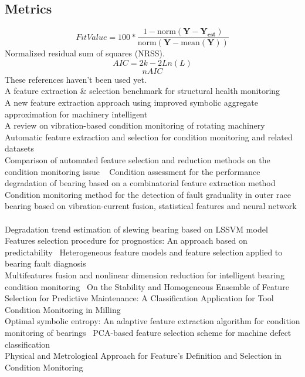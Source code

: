 \documentclass[]{article}
\begin{document}
\subsection{Metrics}
$$ FitValue = 100 * \frac{ 1 - \textrm{norm}(\mathbf{Y} - \mathbf{Y_{est}}) } { \textrm{norm}(\mathbf{Y}-\textrm{mean}(\mathbf{Y})) } $$
Normalized residual sum of squares (NRSS).
$$ AIC = 2k - 2Ln(L) $$  
$$ nAIC $$
These references haven't been used yet.\\
A feature extraction \& selection benchmark for structural health monitoring ~\cite{buckley2023feature}\\
A new feature extraction approach using improved symbolic aggregate approximation for machinery intelligent ~\cite{zhang2019new}\\
A review on vibration-based condition monitoring of rotating machinery ~\cite{tiboni2022review}\\
Automatic feature extraction and selection for condition monitoring and related datasets ~\cite{schneider2018automatic}\\
Comparison of automated feature selection and reduction methods on the condition monitoring issue ~\cite{de2018comparison}
Condition assessment for the performance degradation of bearing based on a combinatorial feature extraction method ~\cite{hong2014condition}\\
Condition monitoring method for the detection of fault graduality in outer race bearing based on vibration-current fusion, statistical features and neural network ~\cite{saucedo2021condition}\\
Degradation trend estimation of slewing bearing based on LSSVM model~\cite{lu2016degradation}\\
Features selection procedure for prognostics: An approach based on predictability~\cite{javed2012features}
Heterogeneous feature models and feature selection applied to bearing fault diagnosis~\cite{rauber2014heterogeneous}\\
Multifeatures fusion and nonlinear dimension reduction for intelligent bearing condition monitoring~\cite{guo2016multifeatures}
On the Stability and Homogeneous Ensemble of Feature Selection for Predictive Maintenance: A Classification Application for Tool Condition Monitoring in Milling~\cite{assafo2023stability}\\
Optimal symbolic entropy: An adaptive feature extraction algorithm for condition monitoring of bearings~\cite{li2023optimal}
PCA-based feature selection scheme for machine defect classification~\cite{malhi2004pca}\\
Physical and Metrological Approach for Feature’s Definition and Selection in Condition Monitoring~\cite{d2019physical}
\clearpage  
\end{document}

